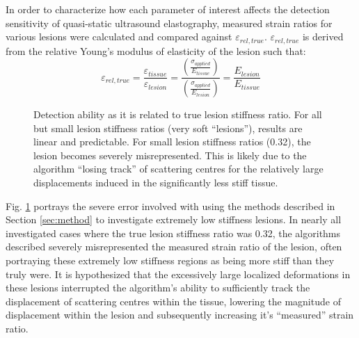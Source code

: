 			In order to characterize how each parameter of interest affects the detection sensitivity of quasi-static ultrasound elastography, measured strain ratios for various lesions were calculated and compared against $\varepsilon_{rel,true}$. $\varepsilon_{rel,true}$ is derived from the relative Young's modulus of elasticity of the lesion such that:
			\begin{equation}
				\varepsilon_{rel,true} = \frac{\varepsilon_{tissue}}{\varepsilon_{lesion}} = \frac{\left(\frac{\sigma_{applied}}{E_{tissue}}\right)}{\left(\frac{\sigma_{applied}}{E_{lesion}}\right)} = \frac{E_{lesion}}{E_{tissue}}
			\end{equation}

			\begin{figure}[!htb]
				\centering
				\caption[Detection ability as it is related to true lesion stiffness ratio]{Detection ability as it is related to true lesion stiffness ratio. For all but small lesion stiffness ratios (very soft ``lesions''), results are linear and predictable. For small lesion stiffness ratios (0.32), the lesion becomes severely misrepresented. This is likely due to the algorithm ``losing track'' of scattering centres for the relatively large displacements induced in the significantly less stiff tissue.}
				\label{fig:error_stiffness_ratio}
			\end{figure}

			Fig. \ref{fig:error_stiffness_ratio} portrays the severe error involved with using the methods described in Section \ref{sec:method} to investigate extremely low stiffness lesions. In nearly all investigated cases where the true lesion stiffness ratio was 0.32, the algorithms described severely misrepresented the measured strain ratio of the lesion, often portraying these extremely low stiffness regions as being more stiff than they truly were. It is hypothesized that the excessively large localized deformations in these lesions interrupted the algorithm's ability to sufficiently track the displacement of scattering centres within the tissue, lowering the magnitude of displacement within the lesion and subsequently increasing it's ``measured'' strain ratio.

